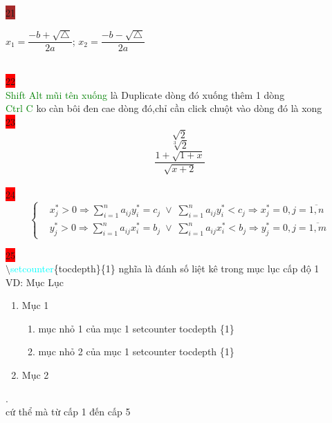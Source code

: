 \documentclass{article}
\begin{document}
\colorbox{brown}{21} \\
\begin{center}
\color{red} $ x_1= \dfrac{-b+  \sqrt\triangle}{2a}$;\quad
\color{red} $x_2 = \dfrac{-b-\sqrt\triangle}{2a}$
\end{center}\\

\colorbox{red}{22}\\

\textcolor{green}{Shift Alt mũi tên xuống} là Duplicate dòng đó xuống thêm 1 dòng\\
\textcolor{green}{Ctrl C} ko càn bôi đen cae dòng đó,chỉ cần click chuột vào dòng đó là xong\\
 
\colorbox{red}{23}\\ %
\[\sqrt{2}\] %
\[\sqrt[3]{2}\] %
\[\dfrac{1+\sqrt{1+x}}{\sqrt{x+2}}\]\\

\colorbox{red}{24}\\

\[\left\{\begin{aligned} 
    & x_j^* > 0 \Longrightarrow \displaystyle\sum\limits_{i=1}^na_{ij}y_i^*=c_j \;\vee\;\displaystyle\sum\limits_{i=1}^na_{ij}y_i^* < c_j\Longrightarrow x_j^* =0,j=\overline{1,n}\\
    & y_j^* > 0 \Longrightarrow \displaystyle\sum\limits_{i=1}^na_{ij}x_i^*=b_j \;\vee\;\displaystyle\sum\limits_{i=1}^na_{ij}x_i^* < b_j\Longrightarrow y_j^* =0,j=\overline{1,m}
\end{aligned}\right.\]

\colorbox{red}{25}\\

$\setminus$\textcolor{cyan}{setcounter}\{tocdepth\}\{1\} nghĩa là đánh số liệt kê trong mục lục cấp độ 1\\
VD: Mục Lục\\
\begin{enumerate}
    \item Mục 1
    \begin{enumerate}[1.]
    \item mục nhỏ 1  của mục 1 setcounter tocdepth \{1\}
    \item mục nhỏ 2  của mục 1 setcounter tocdepth \{1\}
    \end{enumerate}
    \item Mục 2
\end{enumerate}.\\
cứ thể mà từ cấp 1 đến cấp 5\\
\end{document}
